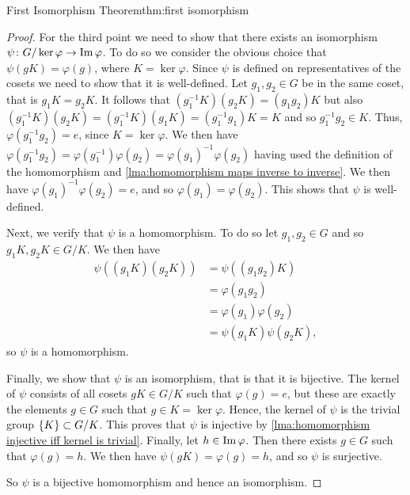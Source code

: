 \begin{thm}{First Isomorphism Theorem}{thm:first isomorphism}
\begin{proof}
        For the third point we need to show that there exists an isomorphism \(\psi\colon G/\ker\varphi \to \operatorname{Im} \varphi\).
        To do so we consider the obvious choice that \(\psi(gK) = \varphi(g)\), where \(K = \ker\varphi\).
        Since \(\psi\) is defined on representatives of the cosets we need to show that it is well-defined.
        Let \(g_1, g_2 \in G\) be in the same coset, that is \(g_1K = g_2K\).
        It follows that \((g_1^{-1}K)(g_2K) = (g_1g_2)K\) but also \((g_1^{-1}K)(g_2K) = (g_1^{-1}K)(g_1K) = (g_1^{-1}g_1)K = K\) and so \(g_1^{-1}g_2 \in K\).
        Thus, \(\varphi(g_1^{-1}g_2) = e\), since \(K = \ker\varphi\).
        We then have \(\varphi(g_1^{-1}g_2) = \varphi(g_1^{-1})\varphi(g_2) = \varphi(g_1)^{-1}\varphi(g_2)\) having used the definition of the homomorphism and \cref{lma:homomorphism maps inverse to inverse}.
        We then have \(\varphi(g_1)^{-1}\varphi(g_2) = e\), and so \(\varphi(g_1) = \varphi(g_2)\).
        This shows that \(\psi\) is well-defined.
        
        Next, we verify that \(\psi\) is a homomorphism.
        To do so let \(g_1, g_2 \in G\) and so \(g_1K, g_2K \in G/K\).
        We then have
        \begin{align}
            \psi((g_1K)(g_2K)) &= \psi((g_1g_2)K)\\
            &= \varphi(g_1g_2)\\
            &= \varphi(g_1)\varphi(g_2)\\
            &= \psi(g_1K)\psi(g_2K),
        \end{align}
        so \(\psi\) is a homomorphism.
        
        Finally, we show that \(\psi\) is an isomorphism, that is that it is bijective.
        The kernel of \(\psi\) consists of all cosets \(gK \in G/K\) such that \(\varphi(g) = e\), but these are exactly the elements \(g \in G\) such that \(g \in K = \ker\varphi\).
        Hence, the kernel of \(\psi\) is the trivial group \(\{K\} \subset G/K\).
        This proves that \(\psi\) is injective by \cref{lma:homomorphism injective iff kernel is trivial}.
        Finally, let \(h \in \operatorname{Im} \varphi\).
        Then there exists \(g \in G\) such that \(\varphi(g) = h\).
        We then have \(\psi(gK) = \varphi(g) = h\), and so \(\psi\) is surjective.
        
        So \(\psi\) is a bijective homomorphism and hence an isomorphism.
    \end{proof}
\end{thm}

